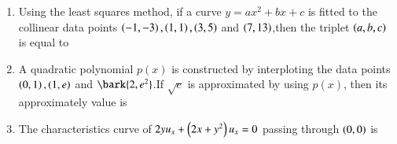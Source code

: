 \documentclass[journal,12pt,onecolumn]{IEEEtran}
\theoremstyle{remark}
\begin{document}
\begin{enumerate}
\item Using the least  squares method, if a curve $y=ax^2+bx+c$ is fitted to the collinear data points $\left(-1,- 3\right),\left(1,1\right),\left(3, 5\right)$ and $\left(7, 13\right)$,then the triplet $\left(a,b,c\right)$ is equal to
\begin{enumerate}
\end{enumerate}

\item A quadratic polynomial $p(x)$ is constructed by interploting the data points $\left(0,1\right),\left(1,e\right)$ and $\bark{2, e^2}$.If $\sqrt{e}$ is approximated by  using $p(x)$, then its approximately value is 
\begin{enumerate}
\end{enumerate}

\item The characteristics curve of $2yu_x+\left(2x+y^2\right)u_x=0$ passing through $\left(0,0\right)$ is 
\begin{enumerate}
\end{enumerate}

\end{enumerate}
\end{document}
